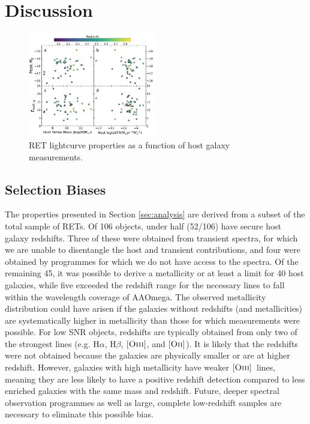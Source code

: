 \documentclass[fleqn,usenatbib,]{mnras}
\newcommand{\halpha}[0]{H$\alpha$}
\newcommand{\hbeta}[0]{H$\beta$}
\newcommand{\OII}[0]{$[\textnormal{\textsc{Oii}}]$}
\newcommand{\OIII}[0]{$[\textnormal{\textsc{Oiii}}]$}
\begin{document}
\section{Discussion}
\label{sec:disc}
\begin{figure}
\includegraphics[width=0.5\textwidth]{figs/RET_vs_host.png}
\caption{RET lightcurve properties as a function of host galaxy measurements.
\label{fig:ret_v_host}}
\end{figure}
\subsection{Selection Biases \label{subsec:disc_bias}}
The properties presented in Section \ref{sec:analysis} are derived from a subset of the total sample of RETs. Of 106 objects, under half (52/106) have secure host galaxy redshifts. Three of these were obtained from transient spectra, for which we are unable to disentangle the host and transient contributions, and four were obtained by programmes for which we do not have access to the spectra. Of the remaining 45, it was possible to derive a metallicity or at least a limit for 40 host galaxies, while five exceeded the redshift range for the necessary lines to fall within the wavelength coverage of AAOmega. The observed metallicity distribution could have arisen if the galaxies without redshifts (and metallicities) are systematically higher in metallicity than those for which measurements were possible. For low SNR objects, redshifts are typically obtained from only two of the strongest lines (e.g. \halpha, \hbeta, \OIII, and \OII). It is likely that the redshifts were not obtained because the galaxies are physically smaller or are at higher redshift. However, galaxies with high metallicity have weaker \OIII~lines, meaning they are less likely to have a positive redshift detection compared to less enriched galaxies with the same mass and redshift. Future, deeper spectral observation programmes as well as large, complete low-redshift samples are necessary to eliminate this possible bias.
\end{document}
